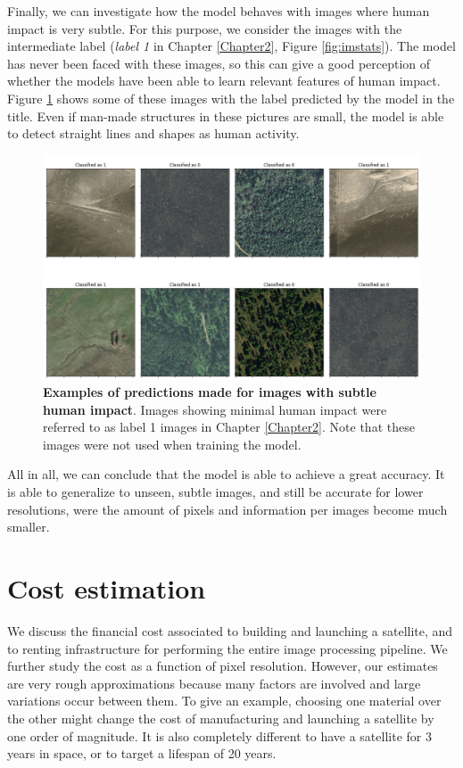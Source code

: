 Finally, we can investigate how the model behaves with images where human impact is very subtle. For this purpose, we consider the images with the intermediate label (\textit{label 1} in Chapter \ref{Chapter2}, Figure \ref{fig:imstats}). The model has never been faced with these images, so this can give a good perception of whether the models have been able to learn relevant features of human impact. Figure \ref{fig:dataset03m_res03_l1} shows some of these images with the label predicted by the model in the title. Even if man-made structures in these pictures are small, the model is able to detect straight lines and shapes as human activity. 

\begin{figure}[H]
	\centering
	\captionsetup{width=1\linewidth}
	\includegraphics[width=1\textwidth]{Figures/results/class_dataset03m_res03_l1.png}
	\caption{\textbf{Examples of predictions made for images with subtle human impact}. Images showing minimal human impact were referred to as label 1 images in Chapter \ref{Chapter2}. Note that these images were not used when training the model.}
	\label{fig:dataset03m_res03_l1}
\end{figure}

All in all, we can conclude that the model is able to achieve a great accuracy. It is able to generalize to unseen, subtle images, and still be accurate for lower resolutions, were the amount of pixels and information per images become much smaller. 


\section{Cost estimation}

We discuss the financial cost associated to building and launching a satellite, and to renting infrastructure for performing the entire image processing pipeline. We further study the cost as a function of pixel resolution. However, our estimates are very rough approximations because many factors are involved and large variations occur between them. To give an example, choosing one material over the other might change the cost of manufacturing and launching a satellite by one order of magnitude. It is also completely different to have a satellite for 3 years in space, or to target a lifespan of 20 years. 

